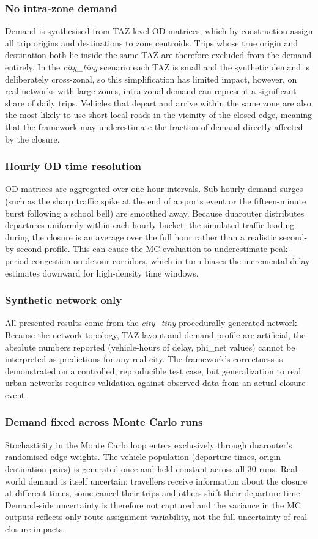 \subsubsection{No intra-zone demand}
Demand is synthesised from TAZ-level OD matrices, which by construction assign all trip origins
and destinations to zone centroids. Trips whose true origin and destination both lie inside the
same TAZ are therefore excluded from the demand entirely. In the \emph{city\_tiny} scenario each
TAZ is small and the synthetic demand is deliberately cross-zonal, so this simplification has
limited impact, however, on real networks with large zones, intra-zonal demand can represent a
significant share of daily trips. Vehicles that depart and arrive within the same zone are also
the most likely to use short local roads in the vicinity of the closed edge, meaning that the
framework may underestimate the fraction of demand directly affected by the closure.

\subsubsection{Hourly OD time resolution}
OD matrices are aggregated over one-hour intervals. Sub-hourly demand surges (such as the sharp
traffic spike at the end of a sports event or the fifteen-minute burst following a school
bell) are smoothed away. Because duarouter distributes departures uniformly within each hourly
bucket, the simulated traffic loading during the closure is an average over the full hour rather
than a realistic second-by-second profile. This can cause the MC evaluation to underestimate
peak-period congestion on detour corridors, which in turn biases the incremental delay estimates
downward for high-density time windows.

\subsubsection{Synthetic network only}
All presented results come from the \emph{city\_tiny} procedurally generated network. Because
the network topology, TAZ layout and demand profile are artificial, the absolute numbers reported
(vehicle-hours of delay, phi\_net values) cannot be interpreted as predictions for any real city.
The framework's correctness is demonstrated on a controlled, reproducible test case, but
generalization to real urban networks requires validation against observed data from an actual
closure event.

\subsubsection{Demand fixed across Monte Carlo runs}
Stochasticity in the Monte Carlo loop enters exclusively through duarouter's randomised edge
weights. The vehicle population (departure times, origin-destination pairs) is generated once and
held constant across all 30 runs. Real-world demand is itself uncertain: travellers receive
information about the closure at different times, some cancel their trips and others shift their
departure time. Demand-side uncertainty is therefore not captured and the variance in the MC
outputs reflects only route-assignment variability, not the full uncertainty of real closure
impacts.

